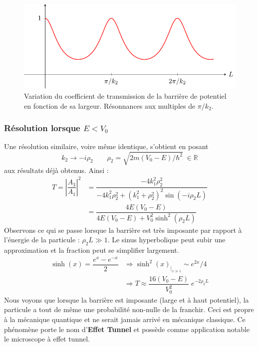 \documentclass{book}
\begin{document}
\begin{figure}[h]
  \centering
  \includegraphics{images/marche_potentiel_transmission.pdf}
  \caption{Variation du coefficient de transmission de la barrière de potentiel en fonction de sa largeur. Résonnances aux multiples de $\pi/k_2$.}
\end{figure}

\subsubsection{Résolution lorsque $E < V_0$}
Une résolution similaire, voire même identique, s'obtient en posant $$k_2 \longrightarrow -i\rho_2 \qquad \rho_2 = \sqrt{2m(V_0-E)/\hbar ^2} \; \in \mathbb{R} $$ aux résultats déjà obtenus. Ainsi :
\begin{align}
  T = \left|\dfrac{A_3}{A_1}\right|^2 &= \dfrac{-4k_1 ^2 \rho_2 ^2}{-4k_1 ^2 \rho_2 ^2 + (k_1 ^2 + \rho_2 ^ 2) ^2\sin(-i\rho_2 L)} \\
  &= \dfrac{4E (V_0-E)}{4E(V_0-E) + V_0 ^2 \sinh ^ 2(\rho_2 L)}
\end{align}
Observons ce qui se passe lorsque la barrière est très imposante par rapport à l'énergie de la particule : $\rho_2L \gg 1$. Le sinus hyperbolique peut subir une approximation et la fraction peut se simplifier largement.
\begin{align}
\sinh(x) = \dfrac{e^{x} - e^{-x}}{2} &\Rightarrow \sinh^2(x)_{|_{x\gg 1}} \sim e^{2x}/4 \\
&\Rightarrow T \approx \dfrac{16(V_0-E)}{V_0 ^2} \; e^{-2\rho_2 L}
\end{align}
Nous voyons que lorsque la barrière est imposante (large et à haut potentiel), la particule a tout de même une probabilité non-nulle de la franchir. Ceci est propre à la mécanique quantique et ne serait jamais arrivé en mécanique classique. Ce phénomène porte le nom d'\textbf{Effet Tunnel} et possède comme application notable le microscope à effet tunnel. \\
\end{document}

